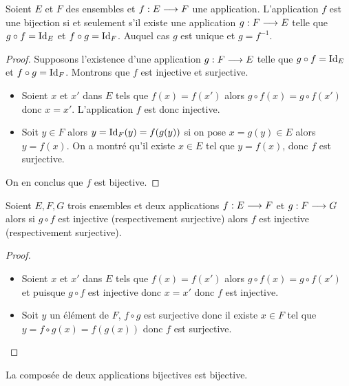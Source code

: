 \begin{theo}
  Soient \(E\) et \(F\) des ensembles et \(f:E \longrightarrow{} F\) une
  application. L'application \(f\) est une bijection si et seulement s'il
  existe une application \(g:F \longrightarrow{} E\) telle que \(g \circ f =
  \operatorname{Id}_E\) et \(f \circ g = \operatorname{Id}_F\). Auquel cas \(g\) est unique et
  \(g = f^{-1}\).
\end{theo}

\begin{proof}
  Supposons l'existence d'une application \(g:F \longrightarrow{} E\) telle que
  \(g \circ f = \operatorname{Id}_E\) et \(f \circ g = \operatorname{Id}_F\). Montrons que \(f\) est
  injective et surjective.
  \begin{itemize}
    \item Soient \(x\) et \(x'\) dans \(E\) tels que \(f(x) = f(x')\) alors
      \(g \circ f(x) = g \circ f(x')\) donc \(x = x'\). L'application \(f\)
      est donc injective.
    \item Soit \(y \in{}F\) alors \(y = \operatorname{Id}_F(y) = f(g(y))\) si on pose \(x = g(y)
      \in{}E\) alors \(y = f(x)\). On a montré qu'il existe \(x \in{}E\) tel
      que \(y = f(x)\), donc \(f\) est surjective.
  \end{itemize}
  On en conclus que \(f\) est bijective.
\end{proof}

\begin{prop}
  Soient \(E, F, G\) trois ensembles et deux applications
  \(f:E \longrightarrow{} F\) et \(g:F \longrightarrow{} G\) alors si \(g \circ f\)
  est injective (respectivement surjective) alors \(f\) est injective
  (respectivement surjective).
\end{prop}

\begin{proof}
  \begin{itemize}
    \item Soient \(x\) et \(x'\) dans \(E\) tels que \(f(x) = f(x')\) alors
      \(g \circ f(x) = g \circ f(x')\) et puisque \(g \circ f\) est
      injective donc \(x = x'\) donc \(f\) est injective.
    \item Soit \(y\) un élément de \(F\), \(f \circ g\) est surjective donc
      il existe \(x \in{}F\) tel que \(y = f \circ g(x) = f(g(x))\) donc
      \(f\) est surjective.
  \end{itemize}
\end{proof}

\begin{prop}
  La composée de deux applications bijectives est bijective.
\end{prop}

